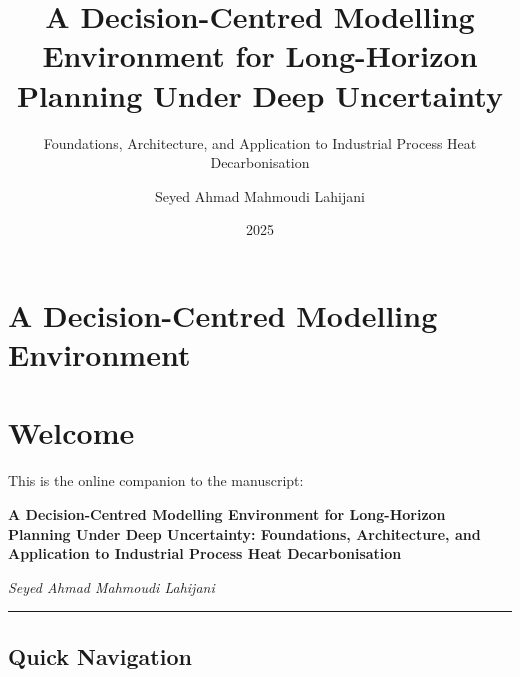 \documentclass[
  11pt,
  a4paper,
  twoside,
  openright]{scrbook}
\title{A Decision-Centred Modelling Environment for Long-Horizon
Planning Under Deep Uncertainty}
\subtitle{Foundations, Architecture, and Application to Industrial
Process Heat Decarbonisation}
\author{Seyed Ahmad Mahmoudi Lahijani}
\date{2025}
\renewcommand*\contentsname{Table of contents}
\newcommand\contentsname{Table of contents}
\begin{document}
\frontmatter
\maketitle

\renewcommand*\contentsname{Table of contents}
{
\setcounter{tocdepth}{2}
\tableofcontents
}

\mainmatter
{}

\chapter{A Decision-Centred Modelling
Environment}\label{a-decision-centred-modelling-environment}


\chapter*{Welcome}\label{welcome}


This is the online companion to the manuscript:

\textbf{A Decision-Centred Modelling Environment for Long-Horizon
Planning Under Deep Uncertainty: Foundations, Architecture, and
Application to Industrial Process Heat Decarbonisation}

\emph{Seyed Ahmad Mahmoudi Lahijani}

\begin{center}\rule{0.5\linewidth}{0.5pt}\end{center}

\section*{Quick Navigation}\label{quick-navigation}

\end{document}
